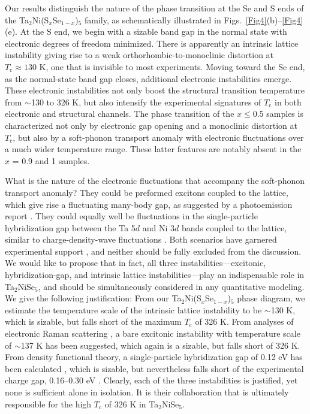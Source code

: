 \documentclass[aps,prl,twocolumn,superscriptaddress]{revtex4-2}
\begin{document}
Our results distinguish the nature of the phase transition at the Se and S ends of the Ta$_2$Ni(S$_x$Se$_{1-x}$)$_5$ family, as schematically illustrated in Figs.~\ref{Fig4}(b)--\ref{Fig4}(e). At the S end, we begin with a sizable band gap in the normal state with electronic degrees of freedom minimized. There is apparently an intrinsic lattice instability giving rise to a weak orthorhombic-to-monoclinic distortion at $T_\textrm{c} \approx 130$ K, one that is invisible to most experiments. Moving toward the Se end, as the normal-state band gap closes, additional electronic instabilities emerge. These electronic instabilities not only boost the structural transition temperature from $\sim$130 to 326 K, but also intensify the experimental signatures of $T_\textrm{c}$ in both electronic and structural channels. The phase transition of the $x \leq 0.5$ samples is characterized not only by electronic gap opening and a monoclinic distortion at $T_\textrm{c}$, but also by a soft-phonon transport anomaly with electronic fluctuations over a much wider temperature range. These latter features are notably absent in the $x$ = 0.9 and 1 samples.

What is the nature of the electronic fluctuations that accompany the soft-phonon transport anomaly? They could be preformed excitons coupled to the lattice, which give rise a fluctuating many-body gap, as suggested by a photoemission report \cite{Fukutani_NatPhys_2021}. They could equally well be fluctuations in the single-particle hybridization gap between the Ta 5$d$ and Ni 3$d$ bands coupled to the lattice, similar to charge-density-wave fluctuations \cite{Lee_PRL_1973, Johnston_1985}. Both scenarios have garnered experimental support \cite{Wakisaka_2009, Watson_PRR_2020, Kim_NatComm_2021, Fukutani_NatPhys_2021, Chen_NatComm_2023, Golez_2022, Katsumi_2023, Baldini_PNAS_2023, Shi_PRL_2025, Rosenberg_PRL_2026}, and neither should be fully excluded from the discussion. We would like to propose that in fact, all three instabilities---excitonic, hybridization-gap, and intrinsic lattice instabilities---play an indispensable role in Ta$_2$NiSe$_5$, and should be simultaneously considered in any quantitative modeling. We give the following justification: From our Ta$_2$Ni(S$_x$Se$_{1-x}$)$_5$ phase diagram, we estimate the temperature scale of the intrinsic lattice instability to be $\sim$130 K, which is sizable, but falls short of the maximum $T_\textrm{c}$ of 326 K. From analyses of electronic Raman scattering \cite{Volkov_2021, Volkov_PRB_2021, Ye_2021, Zhang_arXiv_2025}, a bare excitonic instability with temperature scale of $\sim$137 K has been suggested, which again is a sizable, but falls short of 326 K. From density functional theory, a single-particle hybridization gap of 0.12 eV has been calculated \cite{Watson_PRR_2020}, which is sizable, but nevertheless falls short of the experimental charge gap, 0.16--0.30 eV \cite{Lu_NatComm_2017, Lee_PRB_2019, He_2021}. Clearly, each of the three instabilities is justified, yet none is sufficient alone in isolation. It is their collaboration that is ultimately responsible for the high $T_\textrm{c}$ of 326 K in Ta$_2$NiSe$_5$.
\end{document}
